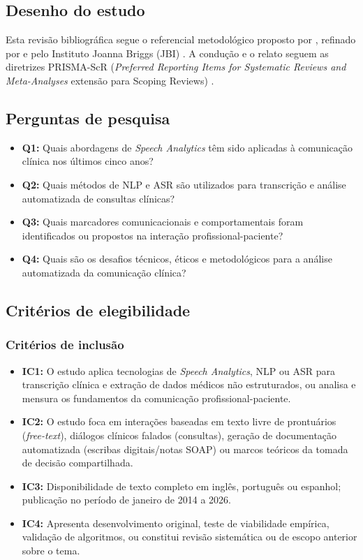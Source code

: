 \documentclass[a4paper,fleqn]{cas-sc}
\begin{document}
\subsection{Desenho do estudo}

Esta revisão bibliográfica segue o referencial metodológico proposto por
\citet{Arksey2005}, refinado por \citet{Levac2010} e pelo Instituto Joanna
Briggs (JBI) \citep{Peters2020}. A condução e o relato seguem as diretrizes
PRISMA-ScR (\textit{Preferred Reporting Items for Systematic Reviews and
Meta-Analyses} extensão para Scoping Reviews) \citep{Tricco2018}.

\subsection{Perguntas de pesquisa}

\begin{itemize}
  \item \textbf{Q1:} Quais abordagens de \textit{Speech Analytics} têm sido
        aplicadas à comunicação clínica nos últimos cinco anos?
  \item \textbf{Q2:} Quais métodos de NLP e ASR são utilizados para transcrição
        e análise automatizada de consultas clínicas?
  \item \textbf{Q3:} Quais marcadores comunicacionais e comportamentais foram
        identificados ou propostos na interação profissional-paciente?
  \item \textbf{Q4:} Quais são os desafios técnicos, éticos e metodológicos
        para a análise automatizada da comunicação clínica?
\end{itemize}

\subsection{Critérios de elegibilidade}

\subsubsection{Critérios de inclusão}
\begin{itemize}
  \item \textbf{IC1:} O estudo aplica tecnologias de \textit{Speech Analytics},
        NLP ou ASR para transcrição clínica e extração de dados médicos não
        estruturados, ou analisa e mensura os fundamentos da comunicação
        profissional-paciente.
  \item \textbf{IC2:} O estudo foca em interações baseadas em texto livre de
        prontuários (\textit{free-text}), diálogos clínicos falados (consultas),
        geração de documentação automatizada (escribas digitais/notas SOAP) ou
        marcos teóricos da tomada de decisão compartilhada.
  \item \textbf{IC3:} Disponibilidade de texto completo em inglês, português ou
        espanhol; publicação no período de janeiro de 2014 a 2026.
  \item \textbf{IC4:} Apresenta desenvolvimento original, teste de viabilidade
        empírica, validação de algoritmos, ou constitui revisão sistemática ou de
        escopo anterior sobre o tema.
\end{itemize}
\end{document}
